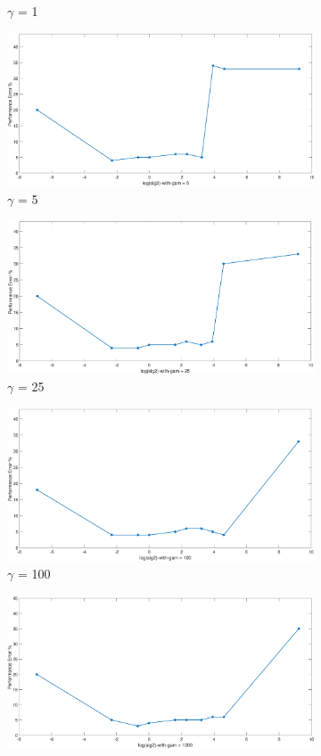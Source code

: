 {\begin{figure}[!ht]
\begin{floatrow}
{\begin{subfigure}{.3\textwidth}
				\caption{$\gamma$ = 1}
				\label{fig:kCV_gamma(1))}
			\end{subfigure}
			\begin{subfigure}{.3\textwidth}
				\includegraphics[height=0.35\linewidth,width=0.7\linewidth]{Exercise1/Report/Ex1.3_kCV_gam(5).eps}
				\caption{$\gamma$ = 5}
				\label{fig:kCV_gamma(5)}
			\end{subfigure}%
			\begin{subfigure}{.3\textwidth}
				\includegraphics[height=0.35\linewidth,width=0.7\linewidth]{Exercise1/Report/Ex1.3_kCV_gam(25).eps}
				\caption{$\gamma$ = 25}
				\label{fig:kCV_gamma(25)}
			\end{subfigure}
			\begin{subfigure}{.3\textwidth}
				\includegraphics[height=0.35\linewidth,width=0.7\linewidth]{Exercise1/Report/Ex1.3_kCV_gam(100).eps}
				\caption{$\gamma$ = 100}
				\label{fig:kCV_gamma(100)}
			\end{subfigure}%
			\begin{subfigure}{.3\textwidth}
				\includegraphics[height=0.35\linewidth,width=0.7\linewidth]{Exercise1/Report/Ex1.3_kCV_gam(1000).eps}

\end{subfigure}}
\end{floatrow}
\end{figure}}

